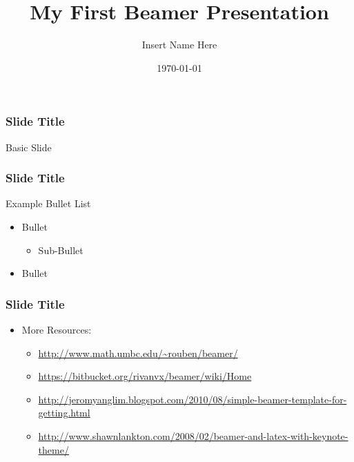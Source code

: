 \documentclass{beamer}
\title[]{My First Beamer Presentation}
\author{Insert Name Here}
\institute[My Company]
{
  \small
  Subtitle\\
  \scriptsize
  \href{mailto:email@example.com}{email@example.com}
}
\date{\today}
\begin{document}
\begin{frame}
\Large
\titlepage
\end{frame}


\begin{frame}[t]
\frametitle{Slide Title}
\Large
Basic Slide
\end{frame}


\begin{frame}[t]
\frametitle{Slide Title}
\bigskip
\Large
\begin{center}
Example Bullet List
\end{center}
\medskip
\begin{itemize}
\item Bullet
\medskip
\begin{itemize}
\item Sub-Bullet
\end{itemize}
\item Bullet
\end{itemize}
\end{frame}


\begin{frame}[t]
\frametitle{Slide Title}
\bigskip
\Large
\begin{itemize}
\item More Resources:
\medskip
\begin{itemize}
\item \url{http://www.math.umbc.edu/~rouben/beamer/}
\medskip
\item \url{https://bitbucket.org/rivanvx/beamer/wiki/Home}
\medskip
\item \url{http://jeromyanglim.blogspot.com/2010/08/simple-beamer-template-for-getting.html}
\medskip
\item \url{http://www.shawnlankton.com/2008/02/beamer-and-latex-with-keynote-theme/}
\end{itemize}
\end{itemize}
\end{frame}
\end{document}
